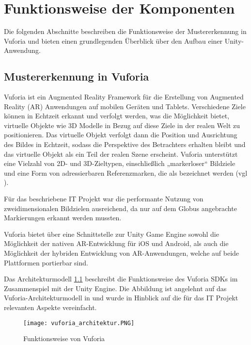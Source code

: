\chapter{Funktionsweise der Komponenten}\label{ch:funktionsweise_der_komponenten}
Die folgenden Abschnitte beschreiben die Funktionsweise der Mustererkennung in Vuforia und bieten einen grundlegenden Überblick über den Aufbau einer Unity-Anwendung.
\section{Mustererkennung in Vuforia}\label{mustererkennung_vuforia}
Vuforia ist ein Augmented Reality Framework für die Erstellung von Augmented Reality (AR) Anwendungen auf mobilen Geräten und Tablets.
Verschiedene Ziele können in Echtzeit erkannt und verfolgt werden, was die Möglichkeit bietet, virtuelle Objekte wie 3D Modelle in Bezug auf diese Ziele in der realen Welt zu positionieren.
Das virtuelle Objekt verfolgt dann die Position und Ausrichtung des Bildes in Echtzeit, sodass die Perspektive des Betrachters erhalten bleibt und das virtuelle Objekt als ein Teil der realen Szene erscheint.
Vuforia unterstützt eine Vielzahl von 2D- und 3D-Zieltypen, einschließlich „markerloser“ Bildziele und eine Form von adressierbaren Referenzmarken, die als  bezeichnet werden (vgl \cite{Vuforia2018}). 

Für das beschriebene IT Projekt war die performante Nutzung von zweidimensionalen Bildzielen ausreichend, da nur auf dem Globus angebrachte Markierungen erkannt werden mussten.

Vuforia bietet über eine Schnittstelle zur Unity Game Engine sowohl die Möglichkeit der nativen AR-Entwicklung für iOS und Android, als auch die Möglichkeit der hybriden Entwicklung von AR-Anwendungen, welche auf beide Plattformen portierbar sind.

Das Architekturmodell \ref{fig:vuforia_architektur} beschreibt die Funktionsweise des Vuforia SDKs im Zusammenspiel mit der Unity Engine. Die Abbildung ist angelehnt auf das Vuforia-Architekturmodell in \cite{Waruwu2015} und wurde in Hinblick auf die für das IT Projekt relevanten Aspekte vereinfacht.

\begin{figure} [h]
\centering
\texttt{[image: vuforia\_architektur.PNG]}
\caption{Funktionsweise von Vuforia}
\label{fig:vuforia_architektur}
\end{figure}
 
